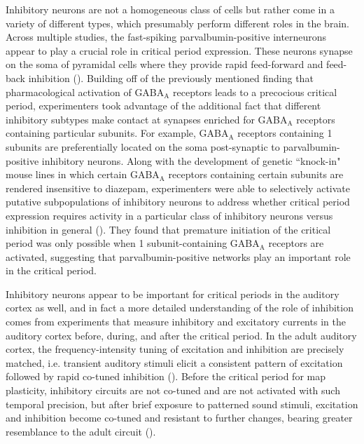 Inhibitory neurons are not a homogeneous class of cells but rather come in a variety of different types, which presumably perform different roles in the brain. Across multiple studies, the fast-spiking parvalbumin-positive interneurons appear to play a crucial role in critical period expression. These neurons synapse on the soma of pyramidal cells where they provide rapid feed-forward and feed-back inhibition (\cite{Markram2004}). Building off of the previously mentioned finding that pharmacological activation of GABA$_\mathrm{A}$ receptors leads to a precocious critical period, experimenters took advantage of the additional fact that different inhibitory subtypes make contact at synapses enriched for GABA$_\mathrm{A}$ receptors containing particular subunits. For example, GABA$_\mathrm{A}$ receptors containing \textalpha{}1 subunits are preferentially located on the soma post-synaptic to parvalbumin-positive inhibitory neurons. Along with the development of genetic ``knock-in" mouse lines in which certain GABA$_\mathrm{A}$ receptors containing certain subunits are rendered insensitive to diazepam, experimenters were able to selectively activate putative subpopulations of inhibitory neurons to address whether critical period expression requires activity in a particular class of inhibitory neurons versus inhibition in general (\cite{Fagiolini2004}). They found that premature initiation of the critical period was only possible when \textalpha{}1 subunit-containing GABA$_\mathrm{A}$ receptors are activated, suggesting that parvalbumin-positive networks play an important role in the critical period.

Inhibitory neurons appear to be important for critical periods in the auditory cortex as well, and in fact a more detailed understanding of the role of inhibition comes from experiments that measure inhibitory and excitatory currents in the auditory cortex before, during, and after the critical period. In the adult auditory cortex, the frequency-intensity tuning of excitation and inhibition are precisely matched, i.e. transient auditory stimuli elicit a consistent pattern of excitation followed by rapid co-tuned inhibition (\cite{Wehr2003, Wehr2005}). Before the critical period for map plasticity, inhibitory circuits are not co-tuned and are not activated with such temporal precision, but after brief exposure to patterned sound stimuli, excitation and inhibition become co-tuned and resistant to further changes, bearing greater resemblance to the adult circuit (\cite{Dorrn2010}).

